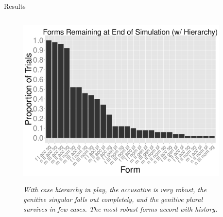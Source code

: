 \documentclass[final]{beamer}
\newlength{\twocolwid}
\begin{document}
\begin{frame}[t]
\begin{columns}[t]
\begin{column}{\twocolwid}
\begin{block}{Results}
\begin{columns}[t]
    \begin{column}{.33\linewidth}
    \begin{figure}
    \begin{center} 
	\vspace{2cm}
	{\centering \includegraphics[width=1\textwidth]{endforms_hierarchy.pdf}}
	 \footnotesize
	\caption{\textit{With case hierarchy in play, the accusative is very robust, the genitive singular falls out completely, and the genitive plural survives in few cases. The most robust forms accord with history.}}
	\end{center}
	\end{figure}
    \end{column}
    
      \begin{column}{.33\linewidth}
      

\end{column}
\end{columns}
\end{block}
\end{column}
\end{columns}
\end{frame}
\end{document}

